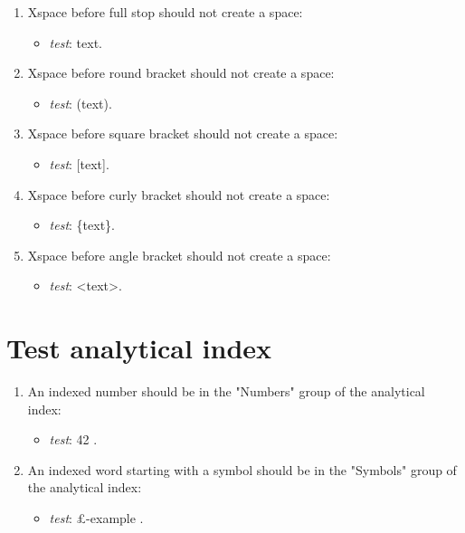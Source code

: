 \begin{enumerate}

\item Xspace before full stop should not create a space: 
\begin{itemize}
	\item \textit{test}: text\xspace.
\end{itemize}

\item Xspace before round bracket should not create a space: 
\begin{itemize}
	\item \textit{test}: (text\xspace).
\end{itemize}

\item Xspace before square bracket should not create a space:
\begin{itemize}
	\item \textit{test}: [text\xspace].
\end{itemize}

\item Xspace before curly bracket should not create a space:
\begin{itemize}
	\item \textit{test}: \{text\xspace\}.
\end{itemize}

\item Xspace before angle bracket should not create a space:
\begin{itemize}
	\item \textit{test}: <text\xspace>.
\end{itemize}

\end{enumerate}

\section{Test analytical index}

\begin{enumerate}

\item An indexed number should be in the "Numbers" group of the analytical index:
\begin{itemize}
\item \textit{test}: 42 .
\end{itemize}

\item An indexed word starting with a symbol should be in the "Symbols" group of the analytical index:
\begin{itemize}
\item \textit{test}: £-example .
\end{itemize}

\end{enumerate}

